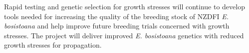 Rapid testing and genetic selection for growth stresses will continue to develop
tools needed for increasing the quality of the breeding stock of NZDFI
\textit{E. bosistoana} and help improve future breeding trials concerned with
growth stresses. The project will deliver improved \textit{E. bosistoana} genetics with
reduced growth stresses for propagation.